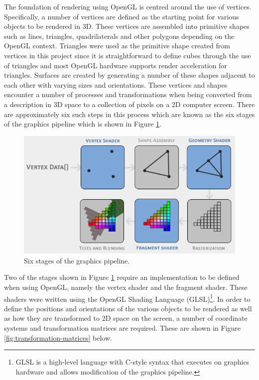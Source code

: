 The foundation of rendering using OpenGL is centred around the use of vertices. Specifically, a number of vertices are defined as the starting point for various objects to be rendered in 3D. These vertices are assembled into primitive shapes such as lines, triangles, quadrilaterals and other polygons depending on the OpenGL context. Triangles were used as the primitive shape created from vertices in this project since it is straightforward to define cubes through the use of triangles and most OpenGL hardware supports render acceleration for triangles. Surfaces are created by generating a number of these shapes adjacent to each other with varying sizes and orientations. These vertices and shapes encounter a number of processes and transformations when being converted from a description in 3D space to a collection of pixels on a 2D computer screen. There are approximately six such steps in this process which are known as the six stages of the graphics pipeline which is shown in Figure \ref{fig:graphics-pipeline}.


\begin{figure}[H]
	\centering
	\includegraphics[width=0.7\linewidth]{figures/graphics-pipeline.PNG}
	\caption{Six stages of the graphics pipeline.}
	\label{fig:graphics-pipeline}
\end{figure}

Two of the stages shown in Figure \ref{fig:graphics-pipeline} require an implementation to be defined when using OpenGL, namely the vertex shader and the fragment shader. These shaders were written using the  OpenGL Shading Language (GLSL)\footnote{GLSL is a high-level language with C-style syntax that executes on graphics hardware and allows modification of the graphics pipeline.}. In order to define the positions and orientations of the various objects to be rendered as well as how they are transformed to 2D space on the screen, a number of coordinate systems and transformation matrices are required. These are shown in Figure \ref{fig:transformation-matrices} below.

